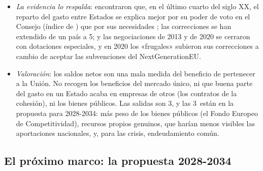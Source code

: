 \documentclass[11pt]{article}
\begin{document}
\begin{itemize}
\begin{itemize}
  \item \emph{sobres y preasignaciones}: dotaciones mínimas por Estado y «regalos» de última hora en las cumbres para regiones concretas; el gasto se diseña para que «vuelva»;
  \item \emph{inercia}: como la alternativa a no acordar es prorrogar el último año del marco anterior (art. 312.4~TFUE), quien gana con el reparto vigente puede vetar cambios; por eso la PAC y la cohesión bajan tan despacio.
  \end{itemize}
\item \emph{La evidencia lo respalda}: \textcite{KauppiWidgren2004} encontraron que, en el último cuarto del siglo XX, el reparto del gasto entre Estados se explica mejor por su poder de voto en el Consejo (índice de ) que por sus necesidades ; las correcciones se han extendido de un país a 5; y las negociaciones de 2013 y de 2020 se cerraron con dotaciones especiales, y en 2020 los «frugales» subieron sus correcciones a cambio de aceptar las subvenciones del NextGenerationEU\nocite{ConsejoEuropeo2020Conclusiones}.
\item \emph{Valoración}: los saldos netos son una mala medida del beneficio de pertenecer a la Unión. No recogen los beneficios del mercado único, ni que buena parte del gasto en un Estado acaba en empresas de otros (los contratos de la cohesión), ni los bienes públicos. Las salidas son 3, y las 3~están en la propuesta para 2028-2034: más peso de los bienes públicos (el Fondo Europeo de Competitividad), recursos propios genuinos, que harían menos visibles las aportaciones nacionales, y, para las crisis, endeudamiento común.
\end{itemize}

\subsection{El próximo marco: la propuesta 2028-2034}\label{sec:mfp-2028}
\end{document}
